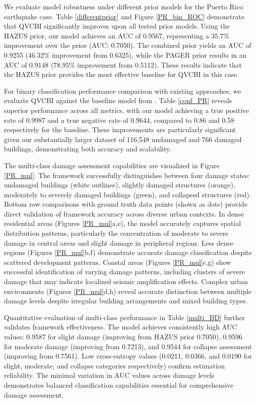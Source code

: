\documentclass[review]{elsarticle}
\begin{document}
We evaluate model robustness under different prior models for the Puerto Rico earthquake case. Table \ref{differentprior} and Figure \ref{PR_bin_ROC} demonstrate that QVCBI significantly improves upon all tested prior models. Using the HAZUS prior, our model achieves an AUC of 0.9567, representing a 35.7\% improvement over the prior (AUC: 0.7050). The combined prior yields an AUC of 0.9255 (46.32\% improvement from 0.6325), while the PAGER prior results in an AUC of 0.9148 (78.95\% improvement from 0.5112). These results indicate that the HAZUS prior provides the most effective baseline for QVCBI in this case.

For binary classification performance comparison with existing approaches, we evaluate QVCBI against the baseline model from \cite{rao2022earthquake}. Table \ref{conf_PR} reveals superior performance across all metrics, with our model achieving a true positive rate of 0.9987 and a true negative rate of 0.9644, compared to 0.86 and 0.58 respectively for the baseline. These improvements are particularly significant given our substantially larger dataset of 116,548 undamaged and 766 damaged buildings, demonstrating both accuracy and scalability.

The multi-class damage assessment capabilities are visualized in Figure \ref{PR_mul}. The framework successfully distinguishes between four damage states: undamaged buildings (white outlines), slightly damaged structures (orange), moderately to severely damaged buildings (green), and collapsed structures (red). Bottom row comparisons with ground truth data points (shown as dots) provide direct validation of framework accuracy across diverse urban contexts. In dense residential areas (Figures \ref{PR_mul}a,e), the model accurately captures spatial distribution patterns, particularly the concentration of moderate to severe damage in central areas and slight damage in peripheral regions. Less dense regions (Figures \ref{PR_mul}b,f) demonstrate accurate damage classification despite scattered development patterns. Coastal areas (Figures \ref{PR_mul}c,g) show successful identification of varying damage patterns, including clusters of severe damage that may indicate localized seismic amplification effects. Complex urban environments (Figures \ref{PR_mul}d,h) reveal accurate distinction between multiple damage levels despite irregular building arrangements and mixed building types.

Quantitative evaluation of multi-class performance in Table \ref{multi_BD} further validates framework effectiveness. The model achieves consistently high AUC values: 0.9587 for slight damage (improving from HAZUS prior 0.7050), 0.9596 for moderate damage (improving from 0.7213), and 0.9544 for collapse assessment (improving from 0.7561). Low cross-entropy values (0.0211, 0.0366, and 0.0190 for slight, moderate, and collapse categories respectively) confirm estimation reliability. The minimal variation in AUC values across damage levels demonstrates balanced classification capabilities essential for comprehensive damage assessment.
\end{document}
